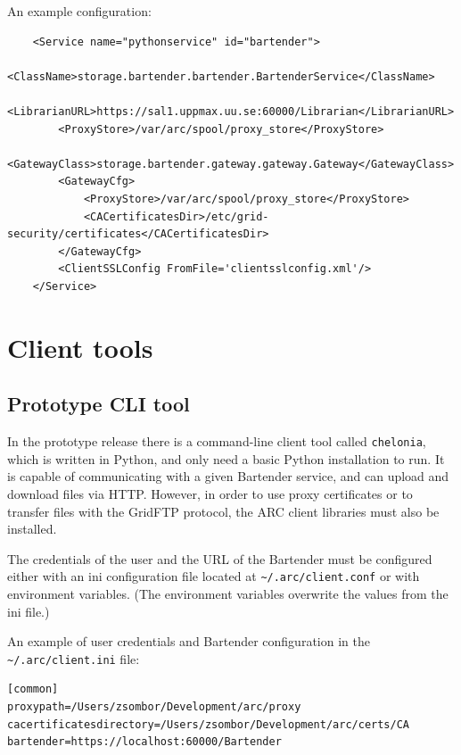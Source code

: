\documentclass{book}
\begin{document}
An example configuration:

\begin{verbatim}
    <Service name="pythonservice" id="bartender">
        <ClassName>storage.bartender.bartender.BartenderService</ClassName>
        <LibrarianURL>https://sal1.uppmax.uu.se:60000/Librarian</LibrarianURL>
        <ProxyStore>/var/arc/spool/proxy_store</ProxyStore>
        <GatewayClass>storage.bartender.gateway.gateway.Gateway</GatewayClass>
        <GatewayCfg>
            <ProxyStore>/var/arc/spool/proxy_store</ProxyStore>
            <CACertificatesDir>/etc/grid-security/certificates</CACertificatesDir>
        </GatewayCfg>
        <ClientSSLConfig FromFile='clientsslconfig.xml'/>
    </Service>
\end{verbatim}


\newpage

\section{Client tools} %
\label{sec:client_tools}

\subsection{Prototype CLI tool} %
\label{sub:prototype_cli_tool}

In the prototype release there is a command-line client tool called \verb!chelonia!, which is written in Python, and only need a basic Python installation to run. It is capable of communicating with a given Bartender service, and can upload and download files via HTTP. However, in order to use proxy certificates or to transfer files with the GridFTP protocol, the ARC client libraries must also be installed.

The credentials of the user and the URL of the Bartender must be
configured either with an ini configuration file located at \verb!~/.arc/client.conf! or with environment variables. (The environment variables overwrite the values from the ini file.)

An example of user credentials and Bartender configuration in the \verb!~/.arc/client.ini! file:

\begin{verbatim}
[common]
proxypath=/Users/zsombor/Development/arc/proxy
cacertificatesdirectory=/Users/zsombor/Development/arc/certs/CA
bartender=https://localhost:60000/Bartender
\end{verbatim}
\end{document}
